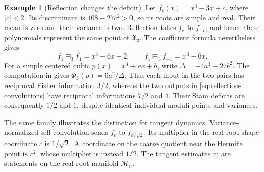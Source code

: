 \documentclass[12pt,reqno]{amsart}
\theoremstyle{definition}
\newtheorem{example}[example]{Example}
\theoremstyle{remark}
\newcommand{\cM}{\mathcal M}
\begin{document}
\begin{example}[Reflection changes the deficit]\label{ex:reflection-deficit}
Let \(f_c(x)=x^3-3x+c\), where \(|c|<2\).  Its discriminant is
\(108-27c^2>0\), so its roots are simple and real.  Their mean is zero
and their variance is two.  Reflection takes \(f_c\) to \(f_{-c}\),
and hence these polynomials represent the same point of
\(\mathfrak X_3\).  The coefficient formula nevertheless gives
\begin{equation}\label{eq:reflection-convolutions}
 f_1\boxplus_3f_1=x^3-6x+2,
 \qquad f_1\boxplus_3f_{-1}=x^3-6x.
\end{equation}
For a simple centered cubic \(p(x)=x^3+ax+b\), write
\(\Delta=-4a^3-27b^2\).  The computation in
 gives
\(\Phi_3(p)=6a^2/\Delta\).  Thus each input in the two pairs has
reciprocal Fisher information \(3/2\), whereas the two outputs in
\eqref{eq:reflection-convolutions} have reciprocal informations
\(7/2\) and \(4\).  Their Stam deficits are consequently
\(1/2\) and \(1\), despite identical individual moduli points and
variances.

The same family illustrates the distinction for tangent dynamics. Variance-normalized self-convolution sends \(f_c\) to
\(f_{c/\sqrt2}\).  Its multiplier in the real root-shape coordinate \(c\) is \(1/\sqrt2\).  A coordinate on the coarse quotient near the Hermite point is \(c^2\), whose multiplier is instead \(1/2\). The tangent estimates in  are statements on the real root manifold \(\cM_n\).
\end{example}




\end{document}
